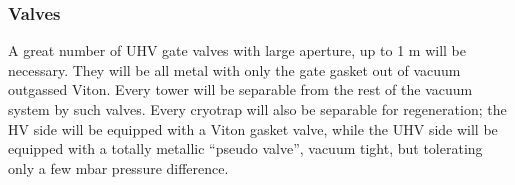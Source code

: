 \subsubsection{Valves}

A great number of UHV gate valves with large aperture, up to 1 m  will be necessary. They will be all metal with only the gate gasket out of vacuum outgassed Viton. Every tower will be separable from the rest of the vacuum system by such valves. Every cryotrap will also be separable for regeneration; the HV side will be equipped with a Viton gasket valve, while the UHV side will be equipped with a totally metallic ``pseudo valve'', vacuum tight, but tolerating only a few mbar pressure difference.
